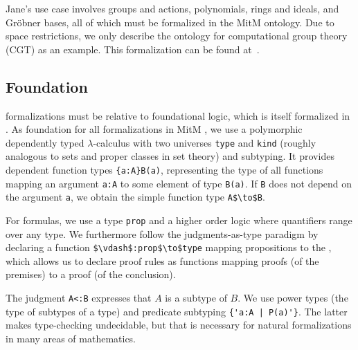 Jane's use case involves groups and actions, polynomials, rings and ideals, and Gröbner bases, all of which must be formalized in the MitM ontology.
Due to space restrictions, we only describe the ontology for computational group theory (CGT) as an example.
This formalization can be found at~\cite{mitm:groups:on}.

\subsection{Foundation}

\OMMT formalizations must be relative to foundational logic, which is itself formalized in \OMMT.
As foundation for all formalizations in MitM \cite{mitm:foundation:on}, we use a polymorphic dependently typed $\lambda$-calculus with two universes \lstinline|type| and \lstinline|kind| (roughly analogous to sets and proper classes in set theory) and subtyping.
It provides dependent function types \lstinline|{a:A}B(a)|, representing the type of all functions mapping an argument \lstinline|a:A| to some element of type \lstinline|B(a)|. If \lstinline|B| does not depend on the argument \lstinline|a|, we obtain the simple function type \lstinline[mathescape]|A$\to$B|.

For formulas, we use a type \lstinline|prop| and a higher order logic where quantifiers range over any type.
We furthermore follow the judgments-as-type paradigm by declaring a function \lstinline[mathescape]|$\vdash$:prop$\to$type| mapping propositions to the , which allows us to declare proof rules as functions mapping proofs (of the premises) to a proof (of the conclusion).

The judgment \lstinline|A<:B| expresses that $A$ is a subtype of $B$.
We use power types (the type of subtypes of a type) and predicate subtyping \lstinline?{'a:A | P(a)'}?.
The latter makes type-checking undecidable, but that is necessary for natural formalizations in many areas of mathematics.

